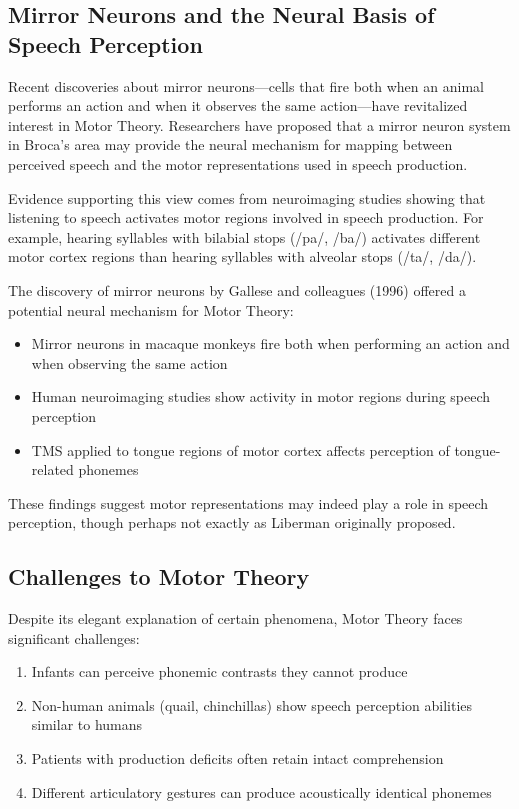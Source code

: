 \documentclass[12pt,a4paper]{article}
\begin{document}
\subsection{Mirror Neurons and the Neural Basis of Speech Perception}

Recent discoveries about mirror neurons—cells that fire both when an animal performs an action and when it observes the same action—have revitalized interest in Motor Theory. Researchers have proposed that a mirror neuron system in Broca's area may provide the neural mechanism for mapping between perceived speech and the motor representations used in speech production.

Evidence supporting this view comes from neuroimaging studies showing that listening to speech activates motor regions involved in speech production. For example, hearing syllables with bilabial stops (/pa/, /ba/) activates different motor cortex regions than hearing syllables with alveolar stops (/ta/, /da/).

\begin{tcolorbox}[enhanced, colback=purple!5, colframe=purple!75!black, title=Mirror Neurons: A Modern Perspective on Motor Theory]
The discovery of mirror neurons by Gallese and colleagues (1996) offered a potential neural mechanism for Motor Theory:

\begin{itemize}
\item Mirror neurons in macaque monkeys fire both when performing an action and when observing the same action
\item Human neuroimaging studies show activity in motor regions during speech perception
\item TMS applied to tongue regions of motor cortex affects perception of tongue-related phonemes
\end{itemize}

These findings suggest motor representations may indeed play a role in speech perception, though perhaps not exactly as Liberman originally proposed.
\end{tcolorbox}

\subsection{Challenges to Motor Theory}

Despite its elegant explanation of certain phenomena, Motor Theory faces significant challenges:

\begin{enumerate}
\item Infants can perceive phonemic contrasts they cannot produce
\item Non-human animals (quail, chinchillas) show speech perception abilities similar to humans
\item Patients with production deficits often retain intact comprehension
\item Different articulatory gestures can produce acoustically identical phonemes
\end{enumerate}
\end{document}
